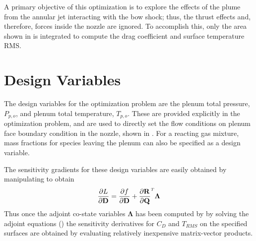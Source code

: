 A primary objective of this optimization is to explore the effects of the plume
from the annular jet interacting with the bow shock; thus, the thrust effects
and, therefore, forces inside the nozzle are ignored.  To accomplish this, only
the area shown in  is integrated to compute the drag
coefficient and surface temperature RMS.


\section{Design Variables}

The design variables for the optimization problem are the plenum total pressure,
$P_{p,o}$, and plenum total temperature, $T_{p,o}$.  These are provided
explicitly in the optimization problem, and are used to directly set the flow
conditions on plenum face boundary condition in the nozzle, shown in
.  For a reacting gas mixture, mass fractions for species
leaving the plenum can also be specified as a design variable.

The sensitivity gradients for these design variables are easily obtained by
manipulating  to obtain
\begin{equation}
  \pd{L}{\md} = \pd{f}{\md} + \rtdiff{}{\mq} \mathbf{\Lambda}
  \label{obj-linearization}
\end{equation}
Thus once the adjoint co-state variables $\mathbf{\Lambda}$ has been computed by
by solving the adjoint equations () the sensitivity
derivatives for $C_D$ and $T_{RMS}$ on the specified surfaces are obtained by
evaluating relatively inexpensive matrix-vector products.
